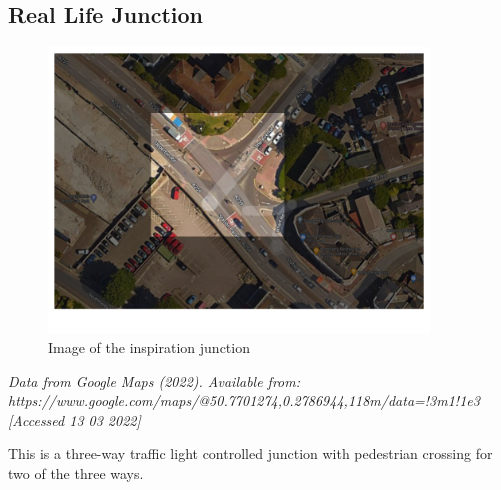 \subsection{Real Life Junction}
\begin{figure}[H]
    \centering
    \includegraphics[width=0.9\textwidth]{images/IRL diagram.png}
    \caption{Image of the inspiration junction}
    \label{fig:IRLJunction}
\end{figure}
\noindent \textit{Data from Google Maps (2022). Available from:\\ https://www.google.com/maps/@50.7701274,0.2786944,118m/data=!3m1!1e3 [Accessed 13 03 2022]}\newline

\noindent This is a three-way traffic light controlled junction with pedestrian crossing for two of the three ways. 


